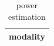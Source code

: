 \begin{table}[h]
\centering
\begin{tabular}{|c|}
\hline
modality \\ \hline
\hline
\end{tabular}
\caption{power estimation}
\label{tab:T20}
\end{table}
